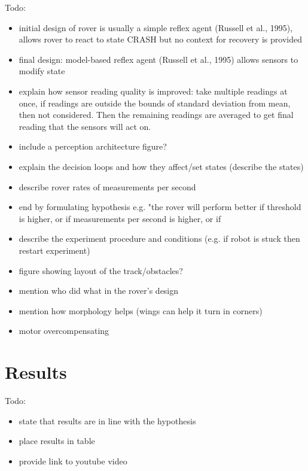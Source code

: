 \documentclass[a4paper,12pt,twocolumn]{article}
\begin{document}
Todo:
\begin{itemize}
    \item initial design of rover is usually a simple reflex agent (Russell et al., 1995), allows rover to react to state CRASH but no context for recovery is provided
    \item final design: model-based reflex agent (Russell et al., 1995) allows sensors to modify state
    \item explain how sensor reading quality is improved: take multiple readings at once, if readings are outside the bounds of standard deviation from mean, then not considered. Then the remaining readings are averaged to get final reading that the sensors will act on.
    \item include a perception architecture figure?
    \item explain the decision loops and how they affect/set states (describe the states)
    \item describe rover rates of measurements per second
    \item end by formulating hypothesis e.g. "the rover will perform better if threshold is higher, or if measurements per second is higher, or if 
    \item describe the experiment procedure and conditions (e.g. if robot is stuck then restart experiment)
    \item figure showing layout of the track/obstacles?
    \item mention who did what in the rover's design
    \item mention how morphology helps (wings can help it turn in corners)
    \item motor overcompensating
\end{itemize}


\section{Results}

Todo:
\begin{itemize}
    \item state that results are in line with the hypothesis
    \item place results in table
    \item provide link to youtube video
\end{itemize}
\end{document}
